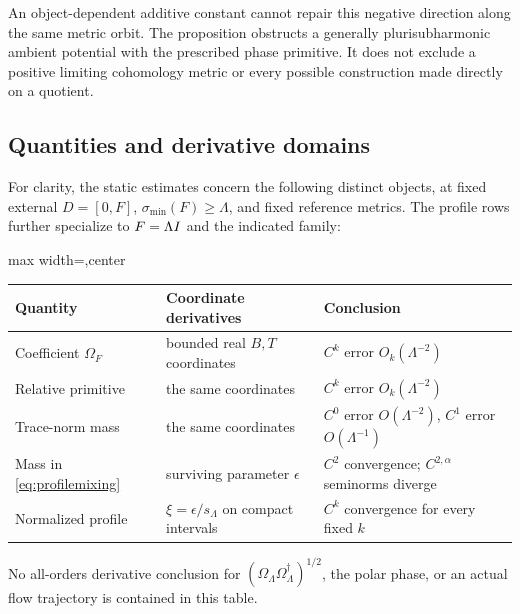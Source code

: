 An object-dependent additive constant cannot repair this negative
direction along the same metric orbit. The proposition obstructs a
generally plurisubharmonic ambient potential with the prescribed
phase primitive. It does not exclude a positive limiting cohomology
metric or every possible construction made directly on a quotient.

\subsection{Quantities and derivative domains}
For clarity, the static estimates concern the following distinct
objects, at fixed external $D=[0,F]$, $\sigma_{\min}(F)\geq\Lambda$,
and fixed reference metrics. The profile rows further specialize to
$F=\Lambda I$ and the indicated family:

\begin{center}
\begin{adjustbox}{max width=\textwidth,center}
\begin{tabular}{lll}
\toprule
Quantity & Coordinate derivatives & Conclusion\\
\midrule
Coefficient $\Omega_F$ & bounded real $B,T$ coordinates
 & $C^k$ error $O_k(\Lambda^{-2})$\\
Relative primitive & the same coordinates
 & $C^k$ error $O_k(\Lambda^{-2})$\\
Trace-norm mass & the same coordinates
 & $C^0$ error $O(\Lambda^{-2})$, $C^1$ error $O(\Lambda^{-1})$\\
Mass in \eqref{eq:profilemixing} & surviving parameter $\epsilon$
 & $C^2$ convergence; $C^{2,\alpha}$ seminorms diverge\\
Normalized profile & $\xi=\epsilon/s_\Lambda$ on compact intervals
 & $C^k$ convergence for every fixed $k$\\
\bottomrule
\end{tabular}
\end{adjustbox}
\end{center}
No all-orders derivative conclusion for
$(\Omega_\Lambda\Omega_\Lambda^\dagger)^{1/2}$, the polar phase,
or an actual flow trajectory is contained in this table.
